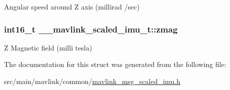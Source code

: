 Angular speed around Z axis (millirad /sec) 

\hypertarget{struct____mavlink__scaled__imu__t_a10577e1d6e32fc231527134352ea9587}{
\subsubsection[{zmag}]{\setlength{\rightskip}{0pt plus 5cm}int16\+\_\+t \+\_\+\+\_\+mavlink\+\_\+scaled\+\_\+imu\+\_\+t\+::zmag}}\label{struct____mavlink__scaled__imu__t_a10577e1d6e32fc231527134352ea9587}


Z Magnetic field (milli tesla) 



The documentation for this struct was generated from the following file\+:\begin{DoxyCompactItemize}
\item 
src/main/mavlink/common/\hyperlink{mavlink__msg__scaled__imu_8h}{mavlink\+\_\+msg\+\_\+scaled\+\_\+imu.\+h}\end{DoxyCompactItemize}
